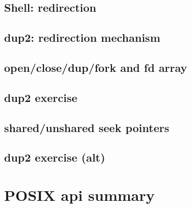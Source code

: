 

\subsection{Shell: redirection}




\subsection{dup2: redirection mechanism}



\subsection{open/close/dup/fork and fd array}


\subsection{dup2 exercise}


\subsection{shared/unshared seek pointers}


\subsection{dup2 exercise (alt)}


\section{POSIX api summary}

